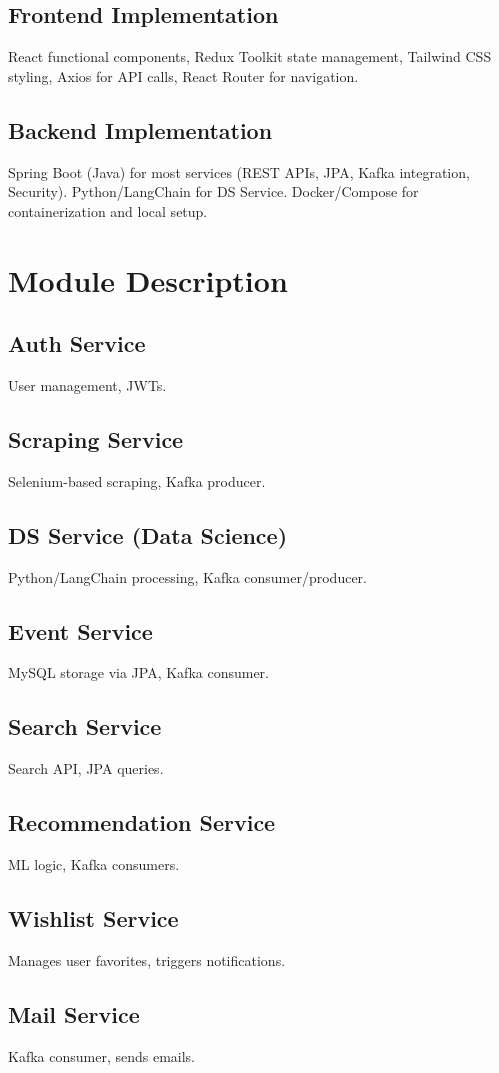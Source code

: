 \documentclass[12pt, a4paper]{report}
\begin{document}
\subsection{Frontend Implementation}
React functional components, Redux Toolkit state management, Tailwind CSS styling, Axios for API calls, React Router for navigation.

\subsection{Backend Implementation}
Spring Boot (Java) for most services (REST APIs, JPA, Kafka integration, Security). Python/LangChain for DS Service. Docker/Compose for containerization and local setup.

\section{Module Description}
\subsection{Auth Service} User management, JWTs.
\subsection{Scraping Service} Selenium-based scraping, Kafka producer.
\subsection{DS Service (Data Science)} Python/LangChain processing, Kafka consumer/producer.
\subsection{Event Service} MySQL storage via JPA, Kafka consumer.
\subsection{Search Service} Search API, JPA queries.
\subsection{Recommendation Service} ML logic, Kafka consumers.
\subsection{Wishlist Service} Manages user favorites, triggers notifications.
\subsection{Mail Service} Kafka consumer, sends emails.
\end{document}
